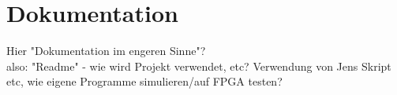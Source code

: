 \chapter{Dokumentation} %
\label{Dokumentation} %

Hier "Dokumentation im engeren Sinne"? \\
also: "Readme" - wie wird Projekt verwendet, etc? Verwendung von Jens Skript etc, wie eigene Programme simulieren/auf FPGA testen?
